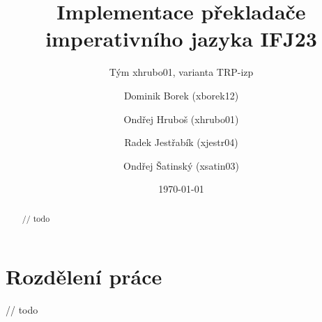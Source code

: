 \documentclass[12pt]{article}
\begin{document}
\title{Implementace překladače imperativního jazyka IFJ23}
\author{
    Tým xhrubo01, varianta TRP-izp
    \and
    Dominik Borek (xborek12)
	\and
    Ondřej Hruboš (xhrubo01)
	\and
	Radek Jestřabík (xjestr04)
	\and
	Ondřej Šatinský (xsatin03)
}
\date{\today}

\maketitle

\begin{abstract}
	// todo
\end{abstract}

\section{Rozdělení práce}
// todo


\end{document}
